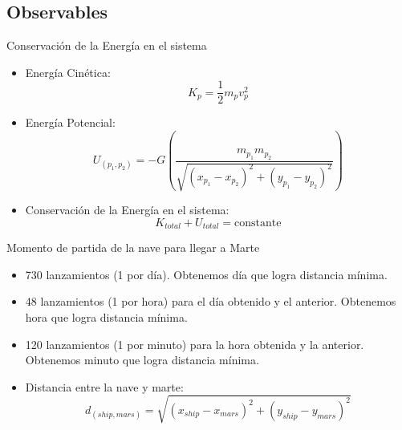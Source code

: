 \documentclass{beamer}
\begin{document}
        \subsection{Observables}

            \begin{frame}{Conservación de la Energía en el sistema}
                \begin{itemize}
                    \item Energía Cinética:
                    \begin{equation*}
                        K_{p} = \frac{1}{2} m_{p} v_{p}^2
                    \end{equation*}
                    \item Energía Potencial:
                    \begin{equation*}
                        U_{(p_1,p_2)} = - G \left( \frac{m_{p_1} m_{p_2}}{\sqrt{(x_{p_1} - x_{p_2})^2 + (y_{p_1} - y_{p_2})^2}} \right)
                    \end{equation*}
                    \item Conservación de la Energía en el sistema:
                    \begin{equation*}
                        K_{total} + U_{total} = \text{constante}
                    \end{equation*}
                \end{itemize}
            \end{frame}

            \begin{frame}{Momento de partida de la nave para llegar a Marte}
                \begin{itemize}
                    \item 730 lanzamientos (1 por día). Obtenemos día que logra distancia mínima.
                    \item 48 lanzamientos (1 por hora) para el día obtenido y el anterior. Obtenemos hora que logra distancia mínima.
                    \item 120 lanzamientos (1 por minuto) para la hora obtenida y la anterior. Obtenemos minuto que logra distancia mínima.
                    \item Distancia entre la nave y marte:
                    \begin{equation*}
                        d_{(ship, mars)} = \sqrt{(x_{ship} - x_{mars})^2 + (y_{ship} - y_{mars})^2}
                    \end{equation*}
                \end{itemize}
            \end{frame}
\end{document}

